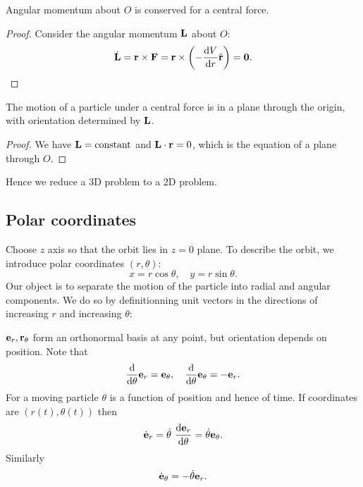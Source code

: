 \begin{proposition}
    Angular momentum about $O$ is conserved for a central force.
\end{proposition}
\begin{proof}
    Consider the angular momentum ${\bf L}$ about $O$: 
    \[
        \dot{{\bf L}} = {\bf r} \times {\bf F} = {\bf r} \times \left( -\frac{\mathrm{d}V}{\mathrm{d}r} \hat{{\bf r}} \right) = \mathbf{0}.\qedhere
    \]
\end{proof}
\begin{proposition}
    The motion of a particle under a central force is in a plane through the origin, with orientation determined by ${\bf L}$.
\end{proposition}
\begin{proof}
    We have $ {\bf L} = \text{constant} $ and $ {\bf L} \cdot {\bf r}=0 $, which is the equation of a plane through $O$.
\end{proof}
Hence we reduce a 3D problem to a 2D problem.

\subsection{Polar coordinates}
Choose $z$ axis so that the orbit lies in $z=0$ plane. To describe the orbit, we introduce polar coordinates $(r, \theta)$:
\[
  x = r\cos\theta, \quad y = r\sin \theta.
\]
Our object is to separate the motion of the particle into radial and angular components. We do so by definitionning unit vectors in the directions of increasing $r$ and increasing $\theta$:
\begin{center}
\end{center}
$ {\bf e}_r,{\bf r}_\theta $ form an orthonormal basis at any point, but orientation depends on position. Note that 
\[
    \frac{\mathrm{d}}{\mathrm{d}\theta}{\bf e}_r = {\bf e}_\theta ,\quad \frac{\mathrm{d}}{\mathrm{d}\theta}{\bf e}_\theta=-{\bf e}_r. 
\]
For a moving particle $ \theta $ is a function of position and hence of time. If coordinates are $ (r(t),\theta(t)) $ then
\[
    \dot{\bfe}_r = \dot{\theta}\ \frac{\mathrm{d}\bfe_r}{\mathrm{d}\theta} = \dot{\theta}\bfe_\theta .
\]
Similarly
\[
    \dot{{\bf e}}_\theta = - \dot{\theta}{\bf e}_r.
\]

